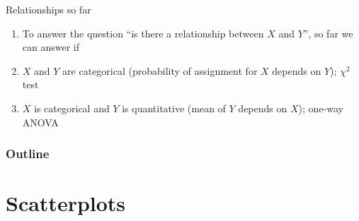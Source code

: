 %
%
%



\subtitle{and the correlation coefficient}

\date{24 November 2015}







\begin{frame}
  \maketitle
\end{frame}



\begin{frame}{Relationships so far}
  \begin{enumerate}
    \item To answer the question ``is there a relationship between $X$ and $Y$'',
      so far we can answer if
    \item $X$ and $Y$ are categorical (probability of assignment for $X$ depends on $Y$); $\chi^2$ test
    \item $X$ is categorical and $Y$ is quantitative (mean of $Y$ depends on $X$); one-way ANOVA
  \end{enumerate}
\end{frame}

\begin{frame}\frametitle<presentation>{Outline}
  \tableofcontents
\end{frame}


\section{Scatterplots}

